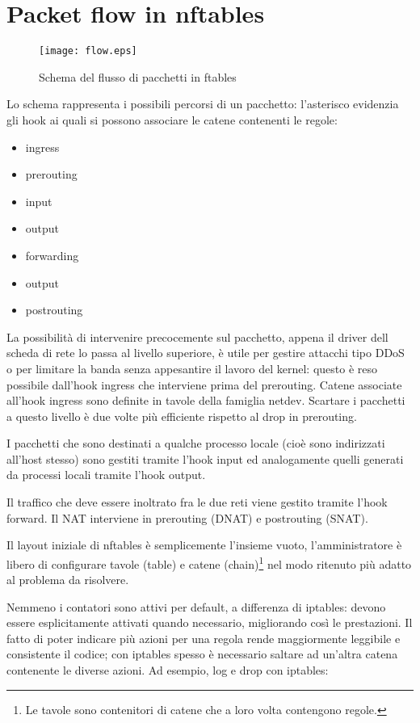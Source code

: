 \section{Packet flow in nftables}

\begin{figure}[H]
    \centering
    \texttt{[image: flow.eps]}
    \caption{Schema del flusso di pacchetti in ftables}
    \label{fig:flow}
\end{figure}
Lo schema rappresenta i possibili percorsi di un pacchetto: l'asterisco
evidenzia gli hook ai quali si possono associare le catene contenenti le
regole:
\begin{itemize}
    \item ingress
    \item prerouting
    \item input
    \item output
    \item forwarding
    \item output
    \item postrouting
\end{itemize}
La possibilit\`a di intervenire precocemente sul pacchetto, appena il driver
dell scheda di rete lo passa al livello superiore, \`e utile per gestire
attacchi tipo DDoS o per limitare la banda senza appesantire il lavoro del
kernel: questo \`e reso possibile dall'hook ingress che interviene prima del
prerouting. Catene associate all'hook ingress sono definite in tavole della
famiglia netdev. Scartare i pacchetti a questo livello \`e due volte
pi\`u efficiente rispetto al drop in prerouting.

I pacchetti che sono destinati a qualche processo locale (cioè sono indirizzati
all'host stesso) sono gestiti tramite l'hook input ed analogamente quelli
generati da processi locali tramite l'hook output.

Il traffico che deve essere inoltrato fra le due reti viene gestito tramite
l'hook forward. Il NAT interviene in prerouting (DNAT) e postrouting (SNAT).

Il layout iniziale di nftables \`e semplicemente l'insieme vuoto,
l'amministratore \`e libero di configurare tavole (table) e catene
(chain)\footnote{Le tavole sono contenitori di catene che a loro volta
contengono regole.} nel modo ritenuto pi\`u adatto al problema da risolvere.

Nemmeno i contatori sono attivi per default, a differenza di iptables:
devono essere esplicitamente attivati quando necessario, migliorando
cos\`i le prestazioni. Il fatto di poter indicare pi\`u azioni per una regola
rende maggiormente leggibile e consistente il codice;
con iptables spesso è necessario saltare ad un'altra catena contenente le diverse
azioni. Ad esempio, log e drop con iptables:


